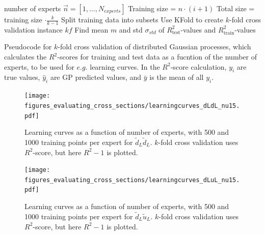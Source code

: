 \documentclass[twoside,english]{uiofysmaster}
\begin{document}
\begin{algorithm}
number of experts $\vec{n} = [1,...,N_{experts}]$ \;
{
Training size =  $n \cdot (i+1)$\;
Total size = training size $\cdot \frac{k}{k-1}$\;
Split training data into subsets\;
Use KFold to create $k$-fold cross validation instance $kf$\;
Find mean $m$ and std $\sigma_{std}$ of $R^2_{\text{test}}$-values and $R^2_{\text{train}}$-values
}
 \caption{Pseudocode for $k$-fold cross validation of distributed Gaussian processes, which calculates the $R^2$-scores for training and test data as a fucntion of the number of experts, to be used for $e.g.$ learning curves. In the $R^2$-score calculation, $y_i$ are true values, $\hat{y}_i$ are GP predicted values, and $\bar{y}$ is the mean of all $y_i$.}
\label{Alg:: evaluating cross : Cross validation DGP}
\end{algorithm}

\begin{figure}
\texttt{[image: figures\_evaluating\_cross\_sections/learningcurves\_dLdL\_nu15.pdf]}
\caption{Learning curves as a function of number of experts, with 500 and 1000 training points per expert for $\tilde{d}_L\tilde{d}_L$. $k$-fold cross validation uses $R^2$-score, but here $R^2-1$ is plotted.}
\label{Fig:: evaluating cross : learning curve dLdL}
\end{figure}

\begin{figure}
\texttt{[image: figures\_evaluating\_cross\_sections/learningcurves\_dLuL\_nu15.pdf]}
\caption{Learning curves as a function of number of experts, with 500 and 1000 training points per expert for $\tilde{d}_L\tilde{u}_L$. $k$-fold cross validation uses $R^2$-score, but here $R^2-1$ is plotted.}
\label{Fig:: evaluating cross : learning curve dLuL}
\end{figure}



\end{document}
